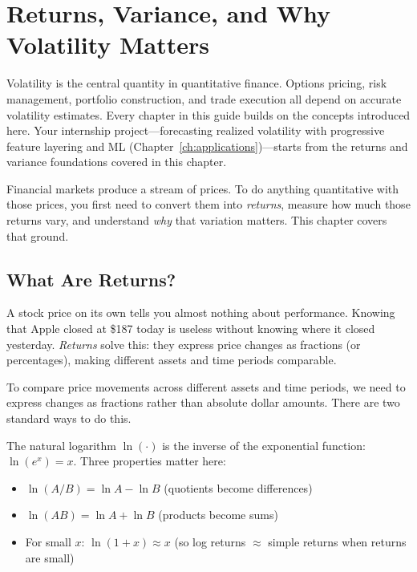 \chapter{Returns, Variance, and Why Volatility Matters}
\label{ch:returns}

\begin{application}
Volatility is the central quantity in quantitative finance.
Options pricing, risk management, portfolio construction, and trade execution all depend on accurate volatility estimates.
Every chapter in this guide builds on the concepts introduced here.
Your internship project---forecasting realized volatility with progressive feature layering and ML (Chapter~\ref{ch:applications})---starts from the returns and variance foundations covered in this chapter.
\end{application}

Financial markets produce a stream of prices.
To do anything quantitative with those prices, you first need to convert them into \emph{returns}, measure how much those returns vary, and understand \emph{why} that variation matters.
This chapter covers that ground.

\section{What Are Returns?}
\label{sec:returns-definition}

A stock price on its own tells you almost nothing about performance.
Knowing that Apple closed at \$187 today is useless without knowing where it closed yesterday.
\emph{Returns} solve this: they express price changes as fractions (or percentages), making different assets and time periods comparable.

To compare price movements across different assets and time periods, we need to express changes as fractions rather than absolute dollar amounts.
There are two standard ways to do this.

\begin{prereq}
The natural logarithm $\ln(\cdot)$ is the inverse of the exponential function: $\ln(e^x) = x$.
Three properties matter here:
\begin{itemize}[nosep]
  \item $\ln(A/B) = \ln A - \ln B$ (quotients become differences)
  \item $\ln(AB) = \ln A + \ln B$ (products become sums)
  \item For small $x$: $\ln(1+x) \approx x$ (so log returns $\approx$ simple returns when returns are small)
\end{itemize}
\end{prereq}

